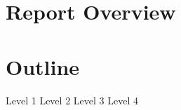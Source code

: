

\maketitle
\section{Report Overview}
\section{Outline}
\begin{outline}[enumerate]
\1 Level 1
\2 Level 2
\3 Level 3
\4 Level 4
\end{outline}

